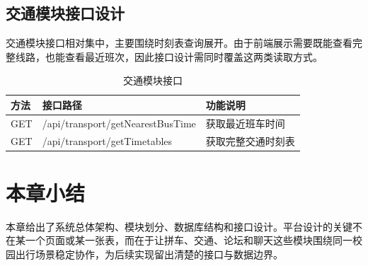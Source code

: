 \subsection{交通模块接口设计}

交通模块接口相对集中，主要围绕时刻表查询展开。由于前端展示需要既能查看完整线路，也能查看最近班次，因此接口设计需同时覆盖这两类读取方式。

\begin{table}[!htbp]
  \caption{交通模块接口}
  \label{tab:transport-api}
  \centering
  \small
  \begin{tabular}{p{1.6cm}p{4.6cm}p{6.2cm}}
    \toprule
    方法 & 接口路径 & 功能说明 \\
    \midrule
    GET & /api/transport/getNearestBusTime & 获取最近班车时间 \\
    GET & /api/transport/getTimetables & 获取完整交通时刻表 \\
    \bottomrule
  \end{tabular}
\end{table}

\section{本章小结}

本章给出了系统总体架构、模块划分、数据库结构和接口设计。平台设计的关键不在某一个页面或某一张表，而在于让拼车、交通、论坛和聊天这些模块围绕同一校园出行场景稳定协作，为后续实现留出清楚的接口与数据边界。
